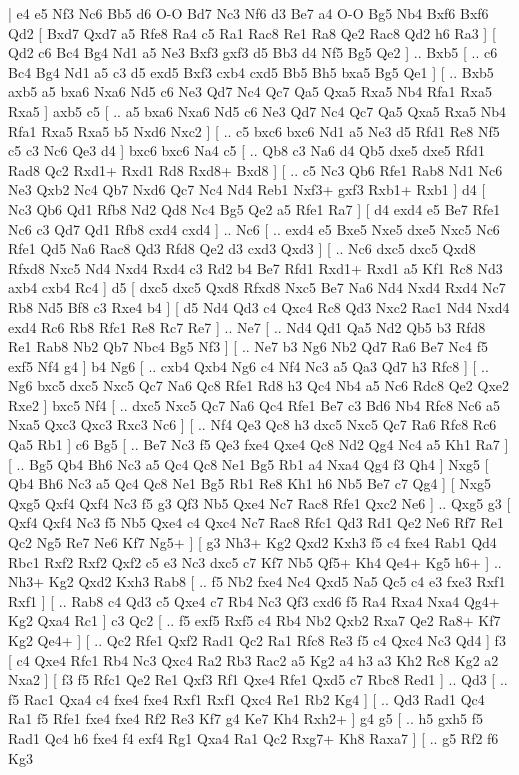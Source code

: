 \makegametitle 
|   e4   e5    Nf3   Nc6    Bb5   d6    O-O   Bd7    Nc3   Nf6    d3   Be7    a4   O-O    Bg5   Nb4    Bxf6   Bxf6    Qd2 [  Bxd7 Qxd7  a5 Rfe8  Ra4 c5  Ra1 Rac8  Re1 Ra8  Qe2 Rac8  Qd2 h6  Ra3   ]  [  Qd2 c6  Bc4 Bg4  Nd1 a5  Ne3 Bxf3  gxf3 d5  Bb3 d4  Nf5 Bg5  Qe2   ] .. Bxb5 [ .. c6  Bc4 Bg4  Nd1 a5  c3 d5  exd5 Bxf3  cxb4 cxd5  Bb5 Bh5  bxa5 Bg5  Qe1   ]  [ .. Bxb5  axb5 a5  bxa6 Nxa6  Nd5 c6  Ne3 Qd7  Nc4 Qc7  Qa5 Qxa5  Rxa5 Nb4  Rfa1 Rxa5  Rxa5   ]  axb5   c5 [ .. a5  bxa6 Nxa6  Nd5 c6  Ne3 Qd7  Nc4 Qc7  Qa5 Qxa5  Rxa5 Nb4  Rfa1 Rxa5  Rxa5 b5  Nxd6 Nxc2   ]  [ .. c5  bxc6 bxc6  Nd1 a5  Ne3 d5  Rfd1 Re8  Nf5 c5  c3 Nc6  Qe3 d4   ]  bxc6   bxc6    Na4   c5    [ .. Qb8  c3 Na6  d4 Qb5  dxe5 dxe5  Rfd1 Rad8  Qc2 Rxd1+  Rxd1 Rd8  Rxd8+ Bxd8   ]  [ .. c5  Nc3 Qb6  Rfe1 Rab8  Nd1 Nc6  Ne3 Qxb2  Nc4 Qb7  Nxd6 Qc7  Nc4 Nd4  Reb1 Nxf3+  gxf3 Rxb1+  Rxb1   ]  d4 [  Nc3 Qb6  Qd1 Rfb8  Nd2 Qd8  Nc4 Bg5  Qe2 a5  Rfe1 Ra7   ]  [  d4 exd4  e5 Be7  Rfe1 Nc6  c3 Qd7  Qd1 Rfb8  cxd4 cxd4   ] .. Nc6 [ .. exd4  e5 Bxe5  Nxe5 dxe5  Nxc5 Nc6  Rfe1 Qd5  Na6 Rac8  Qd3 Rfd8  Qe2 d3  cxd3 Qxd3   ]  [ .. Nc6  dxc5 dxc5  Qxd8 Rfxd8  Nxc5 Nd4  Nxd4 Rxd4  c3 Rd2  b4 Be7  Rfd1 Rxd1+  Rxd1 a5  Kf1 Rc8  Nd3 axb4  cxb4 Rc4   ]  d5 [  dxc5 dxc5  Qxd8 Rfxd8  Nxc5 Be7  Na6 Nd4  Nxd4 Rxd4  Nc7 Rb8  Nd5 Bf8  c3 Rxe4  b4   ]  [  d5 Nd4  Qd3 c4  Qxc4 Rc8  Qd3 Nxc2  Rac1 Nd4  Nxd4 exd4  Rc6 Rb8  Rfc1 Re8  Rc7 Re7   ] .. Ne7    [ .. Nd4  Qd1 Qa5  Nd2 Qb5  b3 Rfd8  Re1 Rab8  Nb2 Qb7  Nbc4 Bg5  Nf3   ]  [ .. Ne7  b3 Ng6  Nb2 Qd7  Ra6 Be7  Nc4 f5  exf5 Nf4  g4   ]  b4   Ng6 [ .. cxb4  Qxb4 Ng6  c4 Nf4  Nc3 a5  Qa3 Qd7  h3 Rfc8   ]  [ .. Ng6  bxc5 dxc5  Nxc5 Qc7  Na6 Qc8  Rfe1 Rd8  h3 Qc4  Nb4 a5  Nc6 Rdc8  Qe2 Qxe2  Rxe2   ]  bxc5   Nf4 [ .. dxc5  Nxc5 Qc7  Na6 Qc4  Rfe1 Be7  c3 Bd6  Nb4 Rfc8  Nc6 a5  Nxa5 Qxc3  Qxc3 Rxc3  Nc6   ]  [ .. Nf4  Qe3 Qc8  h3 dxc5  Nxc5 Qc7  Ra6 Rfc8  Rc6 Qa5  Rb1   ]  c6   Bg5 [ .. Be7  Nc3 f5  Qe3 fxe4  Qxe4 Qc8  Nd2 Qg4  Nc4 a5  Kh1 Ra7   ]  [ .. Bg5  Qb4 Bh6  Nc3 a5  Qc4 Qc8  Ne1 Bg5  Rb1 a4  Nxa4 Qg4  f3 Qh4   ]  Nxg5 [  Qb4 Bh6  Nc3 a5  Qc4 Qc8  Ne1 Bg5  Rb1 Re8  Kh1 h6  Nb5 Be7  c7 Qg4   ]  [  Nxg5 Qxg5  Qxf4 Qxf4  Nc3 f5  g3 Qf3  Nb5 Qxe4  Nc7 Rac8  Rfe1 Qxc2  Ne6   ] .. Qxg5    g3 [  Qxf4 Qxf4  Nc3 f5  Nb5 Qxe4  c4 Qxc4  Nc7 Rac8  Rfc1 Qd3  Rd1 Qe2  Ne6 Rf7  Re1 Qc2  Ng5 Re7  Ne6 Kf7  Ng5+   ]  [  g3 Nh3+  Kg2 Qxd2  Kxh3 f5  c4 fxe4  Rab1 Qd4  Rbc1 Rxf2  Rxf2 Qxf2  c5 e3  Nc3 dxc5  c7 Kf7  Nb5 Qf5+  Kh4 Qe4+  Kg5 h6+   ] .. Nh3+    Kg2   Qxd2    Kxh3   Rab8 [ .. f5  Nb2 fxe4  Nc4 Qxd5  Na5 Qc5  c4 e3  fxe3 Rxf1  Rxf1   ]  [ .. Rab8  c4 Qd3  c5 Qxe4  c7 Rb4  Nc3 Qf3  cxd6 f5  Ra4 Rxa4  Nxa4 Qg4+  Kg2 Qxa4  Rc1   ]  c3   Qc2 [ .. f5  exf5 Rxf5  c4 Rb4  Nb2 Qxb2  Rxa7 Qe2  Ra8+ Kf7  Kg2 Qe4+   ]  [ .. Qc2  Rfe1 Qxf2  Rad1 Qc2  Ra1 Rfc8  Re3 f5  c4 Qxc4  Nc3 Qd4   ]  f3 [  c4 Qxe4  Rfc1 Rb4  Nc3 Qxc4  Ra2 Rb3  Rac2 a5  Kg2 a4  h3 a3  Kh2 Rc8  Kg2 a2  Nxa2   ]  [  f3 f5  Rfc1 Qe2  Re1 Qxf3  Rf1 Qxe4  Rfe1 Qxd5  c7 Rbc8  Red1   ] .. Qd3 [ .. f5  Rac1 Qxa4  c4 fxe4  fxe4 Rxf1  Rxf1 Qxc4  Re1 Rb2  Kg4   ]  [ .. Qd3  Rad1 Qc4  Ra1 f5  Rfe1 fxe4  fxe4 Rf2  Re3 Kf7  g4 Ke7  Kh4 Rxh2+   ]  g4   g5 [ .. h5  gxh5 f5  Rad1 Qc4  h6 fxe4  f4 exf4  Rg1 Qxa4  Ra1 Qc2  Rxg7+ Kh8  Raxa7   ]  [ .. g5  Rf2 f6  Kg3 